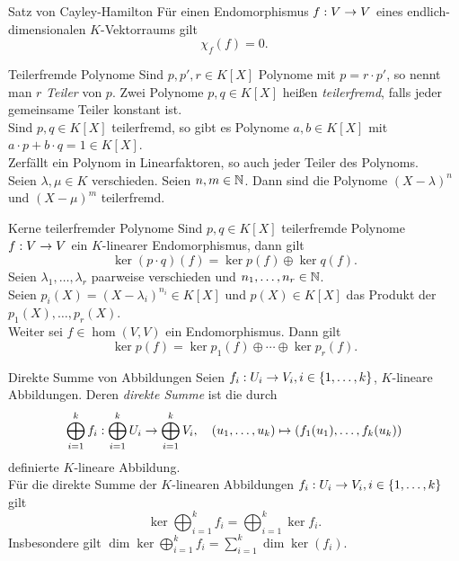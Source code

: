 \documentclass[main.tex]{subfiles}
\begin{document}
\begin{karte}{Satz von Cayley-Hamilton}
    Für einen Endomorphismus \( f : V \rightarrow V \) eines endlich-dimensionalen 
    \( K \)-Vektorraums gilt 
    \[ \chi_f(f) = 0. \]
\end{karte}

\begin{karte}{Teilerfremde Polynome}
    Sind \( p, p', r\in K[X] \) Polynome mit \( p = r \cdot p' \), 
    so nennt man \(r\) \textit{Teiler} von \(p\). Zwei Polynome \(p,q\in K[X]\) heißen 
    \textit{teilerfremd}, falls jeder gemeinsame Teiler konstant ist.\\
    Sind \( p, q\in K[X] \) teilerfremd, so gibt es Polynome \( a,b\in K[X] \) 
    mit \( a\cdot p + b \cdot q = 1 \in K[X] \).\\
    Zerfällt ein Polynom in Linearfaktoren, so auch jeder Teiler des Polynoms.\\
    Seien \( \lambda, \mu \in K \) verschieden. Seien \(n,m\in \mathbb{N}\). Dann sind die 
    Polynome \( (X - \lambda)^n \) und \( (X - \mu)^m \) teilerfremd.
\end{karte}

\begin{karte}{Kerne teilerfremder Polynome}
    Sind \( p,q\in K[X] \) teilerfremde Polynome \( f : V \rightarrow V \) 
    ein \(K\)-linearer Endomorphismus, dann gilt 
    \[ \ker(p\cdot q)(f) = \ker p(f) \oplus \ker q(f). \]
    Seien \( \lambda_1, \ldots, \lambda_r \) paarweise verschieden und 
    \( n_1,\ldots,n_r \in \mathbb{N} \). \\
    Seien \( p_i(X) = (X - \lambda_i)^{n_i} 
    \in K[X] \) und \( p(X) \in K[X] \) das Produkt der \( p_1(X), \ldots,p_r(X) \). \\
    Weiter sei \( f\in \hom(V,V) \) ein Endomorphismus. Dann gilt 
    \[ \ker p(f) = \ker p_1(f) \oplus \cdots \oplus \ker p_r(f). \]
\end{karte}

\begin{karte}{Direkte Summe von Abbildungen}
    Seien \( f_i : U_i \rightarrow V_i, i \in \{1,\ldots,k\} \), 
    \(K\)-lineare Abbildungen. Deren \textit{direkte Summe} ist die durch 
    \[  \bigoplus_{i=1}^k f_i  :  \bigoplus_{i=1}^k U_i  \rightarrow  \bigoplus_{i=1}^k V_i , \quad
    (u_1,\ldots, u_k) \mapsto (f_1(u_1), \ldots, f_k(u_k)) \]
    definierte \(K\)-lineare Abbildung.\\
    Für die direkte Summe der \(K\)-linearen Abbildungen 
    \( f_i : U_i \rightarrow V_i, i \in \{1,\ldots,k\} \) gilt 
    \[ \ker \bigoplus_{i=1}^k f_i = \bigoplus_{i=1}^k \ker f_i. \]
    Insbesondere gilt 
    \( \dim \ker \bigoplus_{i=1}^k f_i = \sum_{i=1}^k \dim \ker(f_i) \).
\end{karte}
\end{document}
